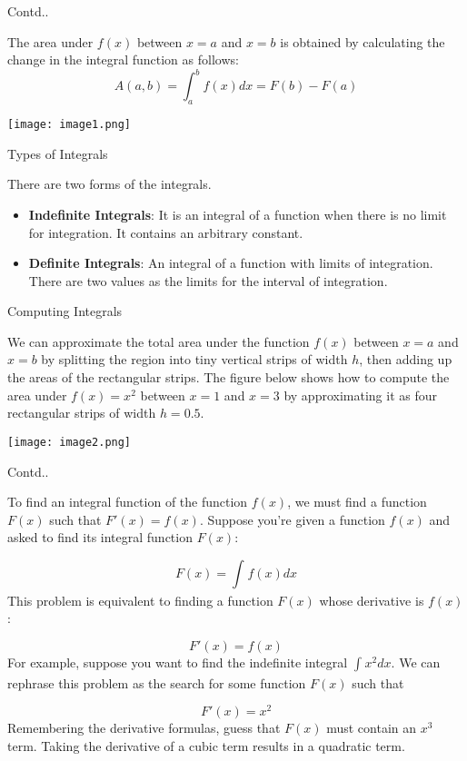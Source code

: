 \documentclass{beamer}
\begin{document}
\begin{frame}{Contd..}
	\begin{flushleft}
		The area under $f(x)$ between $x=a$ and $x=b$ is obtained by calculating the change in the integral function as follows:
		$$A(a,b) = \int_{a}^{b}f(x)dx = F(b) - F(a)$$
	\end{flushleft}
    \texttt{[image: image1.png]}
\end{frame}
\begin{frame}{Types of Integrals}
	\begin{flushleft}
	There are two forms of the integrals. \\ 
	\begin{itemize}
		\item \textbf{Indefinite Integrals}: It is an integral of a function when there is no limit for integration. It contains an arbitrary constant.
		\item \textbf{Definite Integrals}: An integral of a function with limits of integration. There are two values as the limits for the interval of integration.
	\end{itemize}
	\end{flushleft}
\end{frame}
\begin{frame}{Computing Integrals}
\begin{flushleft}
	We can approximate the total area under the function $f(x)$ between $x=a$ and $x=b$ by splitting the region into tiny vertical strips of width $h$, then adding up the areas of the rectangular strips. The figure below shows how to compute the area under $f(x)=x^2$ between $x=1$ and $x=3$ by approximating it as four rectangular strips of width $h=0.5$.
\end{flushleft}
	\texttt{[image: image2.png]}
\end{frame}
\begin{frame}{Contd..}
	\begin{flushleft}
		To find an integral function of the function $f(x)$, we must find a function $F(x)$ such that $F'(x)=f(x)$. Suppose you’re given a function $f(x)$ and asked to find its integral function $F(x)$:

$$F(x)=\int_{}^{}f(x)dx$$
This problem is equivalent to finding a function $F(x)$ whose derivative is $f(x)$:

$$F'(x)=f(x)$$
For example, suppose you want to find the indefinite integral $\int_{}^{}x^2dx$. We can rephrase this problem as the search for some function $F(x)$ such that

$$F'(x)=x^2$$
Remembering the derivative formulas, guess that $F(x)$ must contain an $x^3$ term. Taking the derivative of a cubic term results in a quadratic term.
\end{flushleft}
\end{frame}
\end{document}
